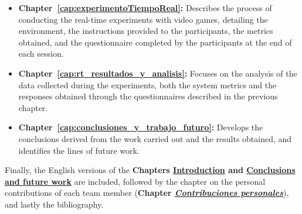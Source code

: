 \begin{itemize}
    \item \textbf{Chapter~\ref{cap:experimentoTiempoReal}:} Describes the process of conducting the 
    real-time experiments with video games, detailing the environment, the 
    instructions provided to the participants, the metrics obtained, and 
    the questionnaire completed by the participants at the end of each session.

    \item \textbf{Chapter~\ref{cap:rt_resultados_y_analisis}:} Focuses on the analysis of the data collected 
    during the experiments, both the system metrics and the responses 
    obtained through the questionnaires described in the previous chapter.

    \item \textbf{Chapter~\ref{cap:conclusiones_y_trabajo_futuro}:} Develops the conclusions derived from the work 
    carried out and the results obtained, and identifies the lines of 
    future work.
\end{itemize}

Finally, the English versions of the \textbf{Chapters \hyperref[cap:introduction]{Introduction} and \hyperref[cap:conclusionsAndFutureWork]{Conclusions and future work}} are included, followed by the chapter on the personal contributions of each team member (\textbf{Chapter \hyperref[cap:contribucionesPersonales]{\textit{Contribuciones personales}}}), and lastly the bibliography.